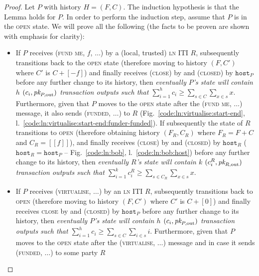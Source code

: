 \begin{proof}
  Let $P$ with history $H = (F, C)$. The induction hypothesis is that the Lemma
  holds for $P$. In order to perform the induction step, assume that $P$ is in
  the \textsc{open} state. We will prove all the following (the facts to be
  proven are shown with emphasis for clarity):
  \begin{itemize}
    \item If $P$ receives (\textsc{fund me}, $f$, $\dots$) by a (local, trusted)
    \textsc{ln} ITI $R$, subsequently transitions back to the \textsc{open}
    state (therefore moving to history $(F, C')$ where $C'$ is $C + [-f]$) and
    finally receives (\textsc{close}) by \environment and (\textsc{closed}) by
    $\texttt{host}_P$ before any further change to its history, then
    \emph{eventually $P$'s \ledger state will contain $h$ $(c_i, \textit{pk}_{P,
    \mathrm{out}})$ transaction outputs such that $\sum\limits_{i=1}^h c_i \geq
    \sum\limits_{s \in C} \sum\limits_{x \in s} x$}. Furthermore, given that $P$
    moves to the \textsc{open} state after the (\textsc{fund me}, $\dots$)
    message, it also sends (\textsc{funded}, $\dots$) to  $R$
    (Fig.~\ref{code:ln:virtualise:start-end},
    l.~\ref{code:ln:virtualise:start-end:funder-funded}). If subsequently the
    state of $R$ transitions to \textsc{open} (therefore obtaining history
    $(F_R, C_R)$ where $F_R = F + C$ and $C_R = [[f]]$), and finally receives
    (\textsc{close}) by \environment and (\textsc{closed}) by $\texttt{host}_R$
    ($\texttt{host}_R = \texttt{host}_P$ -- Fig.~\ref{code:ln:bob},
    l.~\ref{code:ln:bob:host}) before any further change to its history, then
    \emph{eventually $R$'s \ledger state will contain $k$ $(c^R_i, \textit{pk}_{R,
    \mathrm{out}})$ transaction outputs such that $\sum\limits_{i=1}^k c^R_i
    \geq \sum\limits_{s \in C_R} \sum\limits_{x \in s} x$}.
    \item If $P$ receives (\textsc{virtualise}, $\dots$) by an \textsc{ln} ITI
    $R$, subsequently transitions back to \textsc{open} (therefore moving to
    history $(F, C')$ where $C'$ is $C + [0]$) and finally receives
    \textsc{close} by \environment and (\textsc{closed}) by $\texttt{host}_P$
    before any further change to its history, then \emph{eventually $P$'s
    \ledger state will contain $h$ $(c_i, \textit{pk}_{P, \mathrm{out}})$ transaction
    outputs such that $\sum\limits_{i=1}^h c_i \geq \sum\limits_{s \in C}
    \sum\limits_{i \in s} i$}. Furthermore, given that $P$ moves to the
    \textsc{open} state after the (\textsc{virtualise}, $\dots$) message and in
    case it sends (\textsc{funded}, $\dots$) to some party $R$

\end{itemize}
\end{proof}
